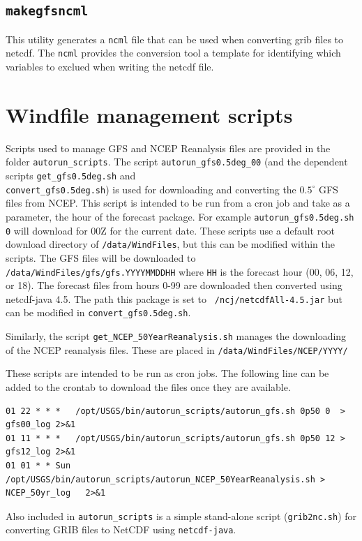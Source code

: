 \documentclass[11pt]{article}   %
\begin{document}
\subsection{\texttt{makegfsncml}}
This utility generates a \texttt{ncml} file that can be used when converting
grib files to netcdf.  The \texttt{ncml} provides the conversion tool a template
for identifying which variables to exclued when writing the netcdf file.

\section{Windfile management scripts}
Scripts used to manage GFS and NCEP Reanalysis files are provided in the
folder \texttt{autorun\_scripts}.
The script \texttt{autorun\_gfs0.5deg\_00} (and the dependent scripts
\texttt{get\_gfs0.5deg.sh} and\\
\texttt{convert\_gfs0.5deg.sh}) is used for downloading and
converting the $0.5^{\circ}$ GFS files from NCEP.  This script is intended to be
run from a cron job and take as a parameter, the hour of the forecast package.  For example
\texttt{autorun\_gfs0.5deg.sh 0} will download for 00Z for the current date.  These 
scripts use a default root download directory of \texttt{/data/WindFiles}, but this can
be modified within the scripts.  The GFS files will be downloaded to\\
\texttt{/data/WindFiles/gfs/gfs.YYYYMMDDHH} where \texttt{HH} is the forecast hour
(00, 06, 12, or 18).  The forecast files from hours 0-99 are downloaded then converted using
netcdf-java 4.5.  The path this package is set to \texttt{~/ncj/netcdfAll-4.5.jar} but can be
modified in \texttt{convert\_gfs0.5deg.sh}.

Similarly, the script \texttt{get\_NCEP\_50YearReanalysis.sh} manages the downloading of 
the NCEP reanalysis files.  These are placed in \texttt{/data/WindFiles/NCEP/YYYY/}

These scripts are intended to be run as cron jobs.  The following line can be added to the
crontab to download the files once they are available.
\footnotesize
\begin{verbatim}
01 22 * * *   /opt/USGS/bin/autorun_scripts/autorun_gfs.sh 0p50 0  > gfs00_log 2>&1
01 11 * * *   /opt/USGS/bin/autorun_scripts/autorun_gfs.sh 0p50 12 > gfs12_log 2>&1
01 01 * * Sun /opt/USGS/bin/autorun_scripts/autorun_NCEP_50YearReanalysis.sh > NCEP_50yr_log   2>&1
\end{verbatim}
\normalsize

Also included in \texttt{autorun\_scripts} is a simple stand-alone script (\texttt{grib2nc.sh})
for converting GRIB files to NetCDF using \texttt{netcdf-java}.
\end{document}
